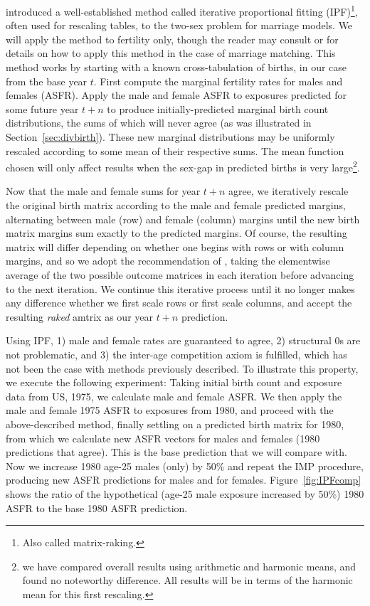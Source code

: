 \FloatBarrier
\citet{mc1975models} introduced a well-established method called iterative
proportional fitting (IPF)\footnote{Also called matrix-raking.}, often used for
rescaling tables, to the two-sex problem for marriage models. We will apply
the method to fertility only, though the reader may consult
\citet{mc1975models} or \citet{Matthews2013} for details on how to apply
this method in the case of marriage matching. This method works by starting with
a known cross-tabulation of births, in our case from the base year $t$. First compute 
the marginal fertility rates for males and females (ASFR). Apply the male and
female ASFR to exposures predicted for some future year $t+n$ to produce
initially-predicted marginal birth count distributions, the sums of which will 
never agree (as was illustrated in Section~\ref{sec:divbirth}). These new
marginal distributions may be uniformly rescaled according to some mean of their
respective sums. The mean function chosen will only affect results when the
sex-gap in predicted births is very large\footnote{we have compared overall
results using arithmetic and harmonic means, and found no noteworthy difference. 
All results will be in terms of the harmonic mean for this first rescaling.}.

Now that the male and female sums for year $t+n$ agree, we iteratively
rescale the original birth matrix according to the male and female
predicted margins, alternating between male (row) and female (column) margins
until the new birth matrix margins sum exactly to the predicted margins. Of
course, the resulting matrix will differ depending on whether one begins with
rows or with column margins, and so we adopt the recommendation of
\citet{Matthews2013}, taking the elementwise average of the two
possible outcome matrices in each iteration before advancing to the next
iteration. We continue this iterative process until it no longer makes any
difference whether we first scale rows or first scale columns, and accept the
resulting \textit{raked} amtrix as our year $t+n$ prediction.

Using IPF, 1) male and female rates are guaranteed to agree, 2) structural 0s
are not problematic, and 3) the inter-age competition axiom is fulfilled,
which has not been the case with methods previously described. To illustrate
this property, we execute the following experiment: Taking initial birth count
and exposure data from US, 1975, we calculate male and female ASFR. We then
apply the male and female 1975 ASFR to exposures from 1980, and proceed with the
above-described method, finally settling on a predicted birth matrix for 1980,
from which we calculate new ASFR vectors for males and females (1980
predictions that agree). This is the base prediction that we will compare with.
Now we increase 1980 age-25 males (only) by 50\% and repeat the IMP procedure,
producing new ASFR predictions for males and for females.
Figure~\ref{fig:IPFcomp} shows the ratio of the hypothetical (age-25 male
exposure increased by 50\%) 1980 ASFR to the base 1980 ASFR prediction.

